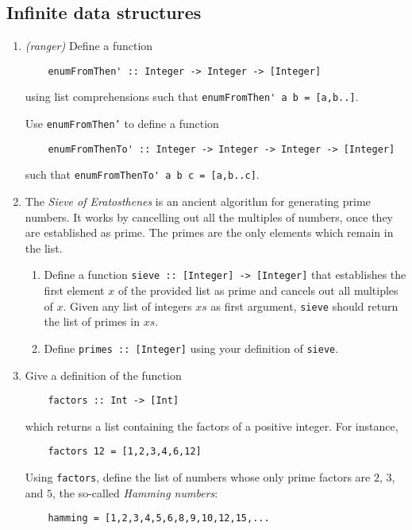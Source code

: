 \documentclass{article}
\def\code#1{\texttt{#1}}
\begin{document}
\subsection{Infinite data structures}
\begin{enumerate}
    \item \textit{(ranger)} Define a function
        \begin{verbatim}
    enumFromThen' :: Integer -> Integer -> [Integer]
        \end{verbatim}
        using list comprehensions such that \verb|enumFromThen' a b = [a,b..]|. \par
        Use \code{enumFromThen'} to define a function
        \begin{verbatim}
    enumFromThenTo' :: Integer -> Integer -> Integer -> [Integer]
        \end{verbatim}
        such that \verb|enumFromThenTo' a b c = [a,b..c]|.

    \item \cite[p. 443]{thompson} The \textit{Sieve of Eratosthenes} is an ancient algorithm for generating prime numbers. It works by cancelling out all the multiples of numbers, once they are established as prime. The primes are the only elements which remain in the list.
    \begin{enumerate}
        \item Define a function \code{sieve :: [Integer] -> [Integer]} that establishes the first element $x$ of the provided list as prime and cancels out all multiples of $x$. Given any list of integers $xs$ as first argument, \code{sieve} should return the list of primes in $xs$.
        \item Define \code{primes :: [Integer]} using your definition of \code{sieve}.
    \end{enumerate}

    \item \cite[p. 447]{thompson} Give a definition of the function
        \begin{verbatim}
    factors :: Int -> [Int]
        \end{verbatim}
        which returns a list containing the factors of a positive integer. For instance,
        \begin{verbatim}
    factors 12 = [1,2,3,4,6,12]
        \end{verbatim}
        Using \code{factors}, define the list of numbers whose only prime factors are $2$, $3$, and $5$, the so-called \textit{Hamming numbers}:
        \begin{verbatim}
    hamming = [1,2,3,4,5,6,8,9,10,12,15,...
        \end{verbatim}


\end{enumerate}
\end{document}

